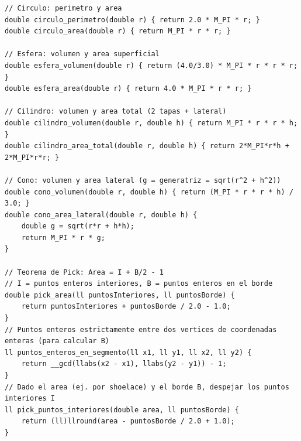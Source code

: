 \documentclass[10pt,twocolumn,letterpaper]{report}
\begin{document}
\begin{lstlisting}
// Circulo: perimetro y area
double circulo_perimetro(double r) { return 2.0 * M_PI * r; }
double circulo_area(double r) { return M_PI * r * r; }

// Esfera: volumen y area superficial
double esfera_volumen(double r) { return (4.0/3.0) * M_PI * r * r * r; }
double esfera_area(double r) { return 4.0 * M_PI * r * r; }

// Cilindro: volumen y area total (2 tapas + lateral)
double cilindro_volumen(double r, double h) { return M_PI * r * r * h; }
double cilindro_area_total(double r, double h) { return 2*M_PI*r*h + 2*M_PI*r*r; }

// Cono: volumen y area lateral (g = generatriz = sqrt(r^2 + h^2))
double cono_volumen(double r, double h) { return (M_PI * r * r * h) / 3.0; }
double cono_area_lateral(double r, double h) {
    double g = sqrt(r*r + h*h);
    return M_PI * r * g;
}

// Teorema de Pick: Area = I + B/2 - 1
// I = puntos enteros interiores, B = puntos enteros en el borde
double pick_area(ll puntosInteriores, ll puntosBorde) {
    return puntosInteriores + puntosBorde / 2.0 - 1.0;
}
// Puntos enteros estrictamente entre dos vertices de coordenadas enteras (para calcular B)
ll puntos_enteros_en_segmento(ll x1, ll y1, ll x2, ll y2) {
    return __gcd(llabs(x2 - x1), llabs(y2 - y1)) - 1;
}
// Dado el area (ej. por shoelace) y el borde B, despejar los puntos interiores I
ll pick_puntos_interiores(double area, ll puntosBorde) {
    return (ll)llround(area - puntosBorde / 2.0 + 1.0);
}
\end{lstlisting}

\end{document}
